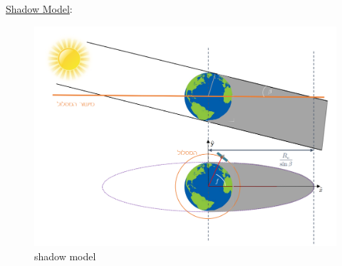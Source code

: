 \documentclass[11pt, a4paper]{article}
\begin{document}
\begin{itemize}
\begin{enumerate}
\begin{equation}
        \end{equation}
        \underline{Shadow Model}:
        \begin{figure}[H]
        \begin{center}
        \includegraphics[width=.8\textwidth]{images/shadow model.png}
        \caption{shadow model \cite{SM_Tutorial_10}}
        \end{center}
        \end{figure}

    \end{enumerate}
\end{itemize}

\newpage


\end{document}

